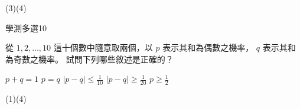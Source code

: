 \begin{QUESTIONS}
\begin{QUESTION}
\begin{QBODY}
        \end{QBODY}
        \begin{QFROMS}
        \end{QFROMS}
        \begin{QTAGS}\end{QTAGS}
        \begin{QANS}
            (3)(4)
        \end{QANS}
        \begin{QSOLLIST}
        \end{QSOLLIST}
        \begin{QEMPTYSPACE}
        \end{QEMPTYSPACE}
    \end{QUESTION}
    \begin{QUESTION}
        \begin{ExamInfo}{93}{學測}{多選}{10}
        \end{ExamInfo}
        \begin{ExamAnsRateInfo}{43}{77}{40}{12}
        \end{ExamAnsRateInfo}
        \begin{QBODY}
            從 $1,2,\dots ,10$ 這十個數中隨意取兩個，以 $p$ 表示其和為偶數之機率， $q$ 表示其和為奇數之機率。 試問下列哪些敘述是正確的？
             \begin{QOPS} 
                \QOP $p+q=1$ 
                \QOP $p=q$  
                \QOP $|p-q| \leq \frac{1}{10} $ 
                \QOP $|p-q| \geq \frac{1}{20}$ \QOP $p\geq \frac{1}{2}$
            \end{QOPS}
        \end{QBODY}
        \begin{QFROMS}
        \end{QFROMS}
        \begin{QTAGS}\end{QTAGS}
        \begin{QANS}
            (1)(4)
        \end{QANS}
        \begin{QSOLLIST}
        \end{QSOLLIST}
        \begin{QEMPTYSPACE}
        \end{QEMPTYSPACE}
    \end{QUESTION}
    \begin{QUESTION}

\end{QUESTION}
\end{QUESTIONS}

